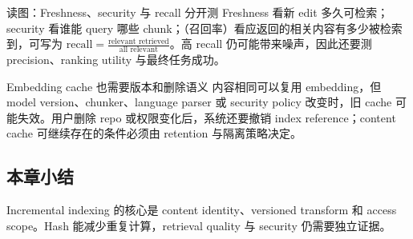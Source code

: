 
\begin{knowledgebox}{读图：Freshness、security 与 recall 分开测}
Freshness 看新 edit 多久可检索；security 看谁能 query 哪些 chunk；（召回率）看应返回的相关内容有多少被检索到，可写为 $\mathrm{recall}=\frac{\text{relevant retrieved}}{\text{all relevant}}$。高 recall 仍可能带来噪声，因此还要测 precision、ranking utility 与最终任务成功。
\end{knowledgebox}

\begin{warningbox}{Embedding cache 也需要版本和删除语义}
内容相同可以复用 embedding，但 model version、chunker、language parser 或 security policy 改变时，旧 cache 可能失效。用户删除 repo 或权限变化后，系统还要撤销 index reference；content cache 可继续存在的条件必须由 retention 与隔离策略决定。
\end{warningbox}

\subsection{本章小结}

Incremental indexing 的核心是 content identity、versioned transform 和 access scope。Hash 能减少重复计算，retrieval quality 与 security 仍需要独立证据。

